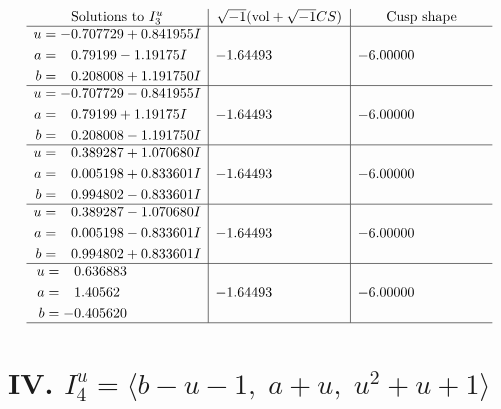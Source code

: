 \documentclass[1p]{elsarticle_modified}
\theoremstyle{definition}
\newcommand{\I}{\sqrt{-1}}
\begin{document}
$$\begin{array}{c|c|c}  
\text{Solutions to }I^u_{3}& \I (\text{vol} + \sqrt{-1}CS) & \text{Cusp shape}\\
 \hline 
\begin{aligned}
u &= -0.707729 + 0.841955 I \\
a &= \phantom{-}0.79199 - 1.19175 I \\
b &= \phantom{-}0.208008 + 1.191750 I\end{aligned}
 & -1.64493\phantom{ +0.000000I} & -6.00000\phantom{ +0.000000I} \\ \hline\begin{aligned}
u &= -0.707729 - 0.841955 I \\
a &= \phantom{-}0.79199 + 1.19175 I \\
b &= \phantom{-}0.208008 - 1.191750 I\end{aligned}
 & -1.64493\phantom{ +0.000000I} & -6.00000\phantom{ +0.000000I} \\ \hline\begin{aligned}
u &= \phantom{-}0.389287 + 1.070680 I \\
a &= \phantom{-}0.005198 + 0.833601 I \\
b &= \phantom{-}0.994802 - 0.833601 I\end{aligned}
 & -1.64493\phantom{ +0.000000I} & -6.00000\phantom{ +0.000000I} \\ \hline\begin{aligned}
u &= \phantom{-}0.389287 - 1.070680 I \\
a &= \phantom{-}0.005198 - 0.833601 I \\
b &= \phantom{-}0.994802 + 0.833601 I\end{aligned}
 & -1.64493\phantom{ +0.000000I} & -6.00000\phantom{ +0.000000I} \\ \hline\begin{aligned}
u &= \phantom{-}0.636883\phantom{ +0.000000I} \\
a &= \phantom{-}1.40562\phantom{ +0.000000I} \\
b &= -0.405620\phantom{ +0.000000I}\end{aligned}
 & -1.64493\phantom{ +0.000000I} & -6.00000\phantom{ +0.000000I}\\
 \hline 
 \end{array}$$\newpage\newpage\renewcommand{\arraystretch}{1}
\centering \section*{IV. $I^u_{4}= \langle b- u-1,\;a+u,\;u^2+u+1 \rangle$}
\end{document}

